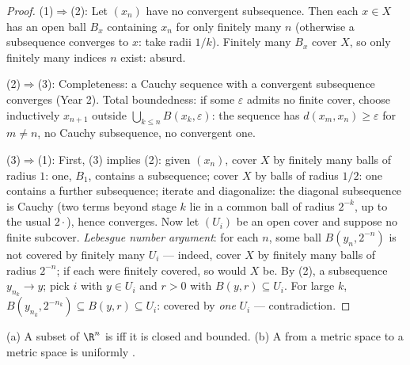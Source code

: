 \begin{proof}
(1)$\Rightarrow$(2): Let $(x_n)$ have no convergent
subsequence. Then each $x \in X$ has an open ball $B_x$
containing $x_n$ for only finitely many $n$ (otherwise a
subsequence converges to $x$: take radii $1/k$). Finitely many
$B_x$ cover $X$, so only finitely many indices $n$ exist:
absurd.

(2)$\Rightarrow$(3): Completeness: a Cauchy sequence with a
convergent subsequence converges (Year 2). Total boundedness: if
some $\varepsilon$ admits no finite cover, choose inductively
$x_{n+1}$ outside $\bigcup_{k\leq n} B(x_k, \varepsilon)$: the
sequence has $d(x_m, x_n) \geq \varepsilon$ for $m \neq n$, no
Cauchy subsequence, no convergent one.

(3)$\Rightarrow$(1): First, (3) implies (2): given $(x_n)$,
cover $X$ by finitely many balls of radius $1$: one, $B_1$,
contains a subsequence; cover $X$ by balls of radius $1/2$: one
contains a further subsequence; iterate and diagonalize: the
diagonal subsequence is Cauchy (two terms beyond stage $k$ lie
in a common ball of radius $2^{-k}$, up to the usual $2\cdot$),
hence converges. Now let $(U_i)$ be an open cover and suppose no
finite subcover. \emph{Lebesgue number argument}: for each $n$,
some ball $B(y_n, 2^{-n})$ is not covered by finitely many
$U_i$ --- indeed, cover $X$ by finitely many balls of radius
$2^{-n}$; if each were finitely covered, so would $X$ be. By
(2), a subsequence $y_{n_k} \to y$; pick $i$ with $y \in U_i$
and $r > 0$ with $B(y, r) \subseteq U_i$. For large $k$,
$B(y_{n_k}, 2^{-n_k}) \subseteq B(y, r) \subseteq U_i$: covered
by \emph{one} $U_i$ --- contradiction.
\end{proof}

\begin{corollary}
\label{cor:b3:topology:heineborel}
(a) A subset of $\R^n$ is  iff it is closed and bounded.
(b) A  from a  metric space to a metric
space is uniformly .
\end{corollary}

